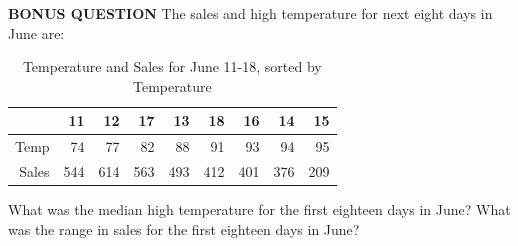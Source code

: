 \documentclass[addpoints,12pt]{exam}
\begin{document}
\begin{questions}
\newpage
\bonusquestion
\textbf{BONUS QUESTION}
\vspace{5mm}
The sales and high temperature for next eight days in June are:
\vspace{5mm}
\begin{table}[ht]
\centering
\begin{tabular}{rrrrrrrrr}
  \hline
 & 11 & 12 & 17 & 13 & 18 & 16 & 14 & 15 \\ 
  \hline
Temp &  74 &  77 &  82 &  88 &  91 &  93 &  94 &  95 \\ 
  Sales & 544 & 614 & 563 & 493 & 412 & 401 & 376 & 209 \\ 
   \hline
\end{tabular}
\caption{Temperature and Sales for June 11-18, sorted by Temperature}
\end{table}
\vspace{5mm}
\begin{parts}
\bonuspart[5] What was the median high temperature for the first eighteen days in June?
\vspace{1cm}
\bonuspart[5] What was the range in sales for the first eighteen days in June?
\vspace{1cm}



\end{parts}
\end{questions}
\end{document}
